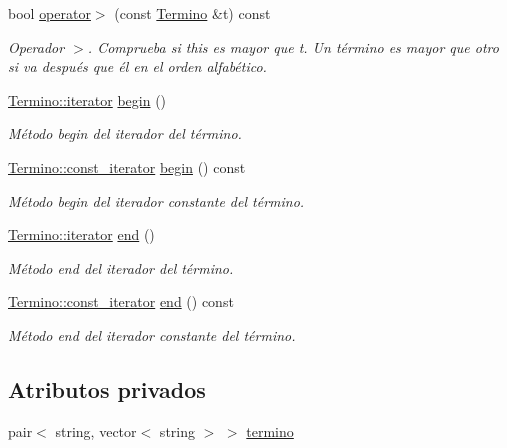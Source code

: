 \begin{DoxyCompactItemize}
bool \hyperlink{classTermino_a72be5a52ffa4dbf55ecd6dfb6af12476}{operator$>$} (const \hyperlink{classTermino}{Termino} \&t) const
\begin{DoxyCompactList}\small\item\em Operador $>$. Comprueba si this es mayor que t. Un término es mayor que otro si va después que él en el orden alfabético. \end{DoxyCompactList}\item 
\hyperlink{classTermino_a47bf17fd54656f315aa9257b4372e875}{Termino\+::iterator} \hyperlink{classTermino_a7ff605c38c22fd1c16573ad2c2900247}{begin} ()
\begin{DoxyCompactList}\small\item\em Método begin del iterador del término. \end{DoxyCompactList}\item 
\hyperlink{classTermino_a0c8a38779eb1a65b8fe9422b430895c9}{Termino\+::const\+\_\+iterator} \hyperlink{classTermino_abf06215ba85528bc636f337103328345}{begin} () const
\begin{DoxyCompactList}\small\item\em Método begin del iterador constante del término. \end{DoxyCompactList}\item 
\hyperlink{classTermino_a47bf17fd54656f315aa9257b4372e875}{Termino\+::iterator} \hyperlink{classTermino_af23d49a79988f917c61969564002c162}{end} ()
\begin{DoxyCompactList}\small\item\em Método end del iterador del término. \end{DoxyCompactList}\item 
\hyperlink{classTermino_a0c8a38779eb1a65b8fe9422b430895c9}{Termino\+::const\+\_\+iterator} \hyperlink{classTermino_af14f79a17426160db9db162737e18b96}{end} () const
\begin{DoxyCompactList}\small\item\em Método end del iterador constante del término. \end{DoxyCompactList}\end{DoxyCompactItemize}
\subsection*{Atributos privados}
\begin{DoxyCompactItemize}
\item 
pair$<$ string, vector$<$ string $>$ $>$ \hyperlink{classTermino_a5656fe283f6e949ec67d6231f7154a3d}{termino}
\end{DoxyCompactItemize}
